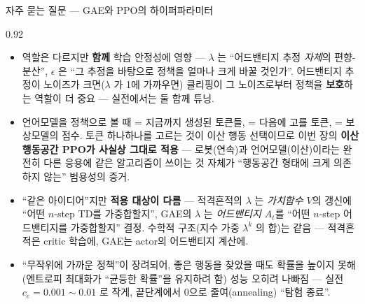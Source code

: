 \begin{frame}{자주 묻는 질문 — GAE와 PPO의 하이퍼파라미터}
\begin{center}\begin{varwidth}{0.92\textwidth}
  \small
  \begin{itemize}
    \item {} 역할은 다르지만 \textbf{함께} 학습 안정성에 영향 —
      $\lambda$ 는 ``어드밴티지 추정 \textit{자체}의
      편향-분산'', $\epsilon$ 은 ``그 추정을 바탕으로 정책을
      얼마나 크게 바꿀 것인가''. 어드밴티지 추정이 노이즈가
      크면($\lambda$ 가 1에 가까우면) 클리핑이 그 노이즈로부터
      정책을 \textbf{보호}하는 역할이 더 중요 — 실전에서는 둘
      함께 튜닝.
    \item {}
      언어모델을 정책으로 볼 때  = 지금까지 생성된
      토큰들,  = 다음에 고를 토큰,  =
      보상모델의 점수. 토큰 하나하나를 고르는 것이 이산 행동
      선택이므로 이번 장의 \textbf{이산 행동공간 PPO가 사실상
      그대로 적용} — 로봇(연속)과 언어모델(이산)이라는 완전히
      다른 응용에 같은 알고리즘이 쓰이는 것 자체가 ``행동공간
      형태에 크게 의존하지 않는'' 범용성의 증거.
    \item {} ``같은 아이디어''지만
      \textbf{적용 대상이 다름} — 적격흔적의 $\lambda$ 는
      \textit{가치함수 $V$}의 갱신에 ``어떤 $n$-step TD를
      가중합할지'', GAE의 $\lambda$ 는 \textit{어드밴티지
      $A_t$}를 ``어떤 $n$-step 어드밴티지를 가중합할지'' 결정.
      수학적 구조(지수 가중 $\lambda^k$ 의 합)는 같음 —
      적격흔적은 critic 학습에, GAE는 actor의 어드밴티지
      계산에.
    \item {} ``무작위에
      가까운 정책''이 장려되어, 좋은 행동을 찾았을 때도 확률을
      높이지 못해(엔트로피 최대화가 ``균등한 확률''을 유지하려
      함) 성능 오히려 나빠짐 — 실전 $c_e=0.001\sim0.01$ 로
      작게, 끝단계에서 0으로 줄여(annealing) ``탐험 종료''.
  \end{itemize}
\end{varwidth}\end{center}
\end{frame}
